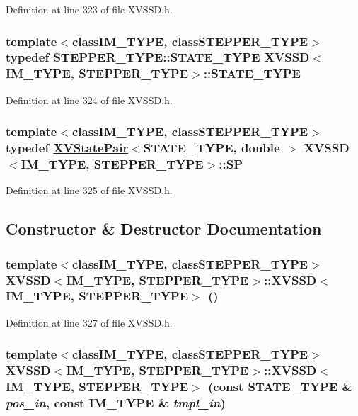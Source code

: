 Definition at line 323 of file XVSSD.h.\label{XVSSD_s1}
\hypertarget{class_XVSSD_s1}{
\subsubsection[STATE_TYPE]{\setlength{\rightskip}{0pt plus 5cm}template$<$classIM\_\-TYPE, classSTEPPER\_\-TYPE$>$ typedef STEPPER\_\-TYPE::STATE\_\-TYPE XVSSD$<$IM\_\-TYPE, STEPPER\_\-TYPE$>$::STATE\_\-TYPE}}




Definition at line 324 of file XVSSD.h.\label{XVSSD_s2}
\hypertarget{class_XVSSD_s2}{
\subsubsection[SP]{\setlength{\rightskip}{0pt plus 5cm}template$<$classIM\_\-TYPE, classSTEPPER\_\-TYPE$>$ typedef \hyperlink{class_XVStatePair}{XVState\-Pair}$<$STATE\_\-TYPE, double $>$ XVSSD$<$IM\_\-TYPE, STEPPER\_\-TYPE$>$::SP}}




Definition at line 325 of file XVSSD.h.

\subsection{Constructor \& Destructor Documentation}
\label{XVSSD_a0}
\hypertarget{class_XVSSD_a0}{
\subsubsection[XVSSD]{\setlength{\rightskip}{0pt plus 5cm}template$<$classIM\_\-TYPE, classSTEPPER\_\-TYPE$>$ XVSSD$<$IM\_\-TYPE, STEPPER\_\-TYPE$>$::XVSSD$<$IM\_\-TYPE, STEPPER\_\-TYPE$>$ ()}}




Definition at line 327 of file XVSSD.h.\label{XVSSD_a1}
\hypertarget{class_XVSSD_a1}{
\subsubsection[XVSSD]{\setlength{\rightskip}{0pt plus 5cm}template$<$classIM\_\-TYPE, classSTEPPER\_\-TYPE$>$ XVSSD$<$IM\_\-TYPE, STEPPER\_\-TYPE$>$::XVSSD$<$IM\_\-TYPE, STEPPER\_\-TYPE$>$ (const STATE\_\-TYPE \& {\em pos\_\-in}, const IM\_\-TYPE \& {\em tmpl\_\-in})}}




